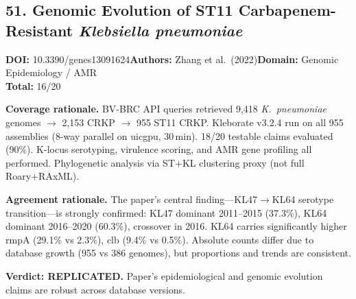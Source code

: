 \subsection{51. Genomic Evolution of ST11 Carbapenem-Resistant \textit{Klebsiella pneumoniae}}
\textbf{DOI:} 10.3390/genes13091624\quad\textbf{Authors:} Zhang et al.\ (2022)\quad\textbf{Domain:} Genomic Epidemiology / AMR\\
\quad{}\quad\textbf{Total:} 16/20\par\smallskip
\noindent\textbf{Coverage rationale.} BV-BRC API queries retrieved 9,418 \textit{K.\ pneumoniae} genomes $\to$ 2,153 CRKP $\to$ 955 ST11 CRKP. Kleborate v3.2.4 run on all 955 assemblies (8-way parallel on uicgpu, 30\,min). 18/20 testable claims evaluated (90\%). K-locus serotyping, virulence scoring, and AMR gene profiling all performed. Phylogenetic analysis via ST+KL clustering proxy (not full Roary+RAxML).\par
\noindent\textbf{Agreement rationale.} The paper's central finding---KL47$\to$KL64 serotype transition---is strongly confirmed: KL47 dominant 2011--2015 (37.3\%), KL64 dominant 2016--2020 (60.3\%), crossover in 2016. KL64 carries significantly higher rmpA (29.1\% vs 2.3\%), clb (9.4\% vs 0.5\%). Absolute counts differ due to database growth (955 vs 386 genomes), but proportions and trends are consistent.\par\smallskip
\noindent\textbf{Verdict: REPLICATED.} Paper's epidemiological and genomic evolution claims are robust across database versions.

